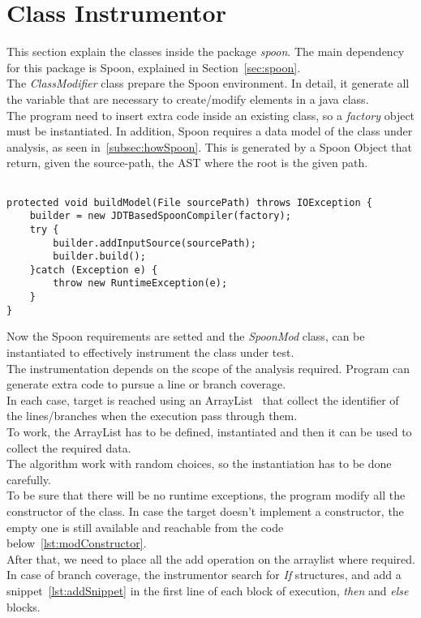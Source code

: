 \section{Class Instrumentor}\label{sec:ClassInstr}
This section explain the classes inside the package \emph{spoon}.
The main dependency for this package is Spoon, explained in Section~\ref{sec:spoon}.\\
The \emph{ClassModifier} class prepare the Spoon environment.
In detail, it generate all the variable that are necessary to create/modify elements in a java class.\\
The program need to insert extra code inside an existing class, so a \emph{factory} object must be instantiated.
In addition, Spoon requires a data model of the class under analysis, as seen in~\ref{subsec:howSpoon}.
This is generated by a Spoon Object that return, given the source-path, the AST where the root is the given path.
\begin{lstlisting}[caption={The function to create the AST from the ClassModifier class},label={lst:ASTmodel}]% Start your code-block

protected void buildModel(File sourcePath) throws IOException {
	builder = new JDTBasedSpoonCompiler(factory);		
	try {
		builder.addInputSource(sourcePath);
		builder.build();
	}catch (Exception e) {
		throw new RuntimeException(e);
	}		
}
\end{lstlisting}
Now the Spoon requirements are setted and the \emph{SpoonMod} class, can be instantiated to effectively instrument the class under test.\\
The instrumentation depends on the scope of the analysis required.
Program can generate extra code to pursue a line or branch coverage.\\
In each case, target is reached using an ArrayList~\cite{ArrayList} that collect the identifier of the lines/branches when the execution pass through them.\\
To work, the ArrayList has to be defined, instantiated and then it can be used to collect the required data.\\
The algorithm work with random choices, so the instantiation has to be done carefully.\\
To be sure that there will be no runtime exceptions, the program modify all the constructor of the class.
In case the target doesn't implement a constructor, the empty one is still available and reachable from the code below~\ref{lst:modConstructor}.\\
After that, we need to place all the add operation on the arraylist where required.
In case of branch coverage, the instrumentor search for \emph{If} structures, and add a snippet~\ref{lst:addSnippet} in the first line of each block of execution, \emph{then} and \emph{else} blocks.\\

